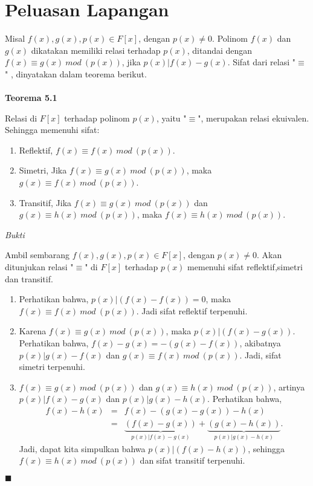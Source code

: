 \chapter{Peluasan Lapangan}
\par 	Misal $f(x),g(x),p(x) \in F[x]$, dengan $p(x) \ne 0$. Polinom $f(x)$ dan $g(x)$ dikatakan memiliki relasi terhadap $p(x)$, ditandai dengan $f(x) \equiv g(x)~mod~(p(x))$, jika $p(x)|f(x) - g(x)$. Sifat dari relasi "$\equiv$" , dinyatakan dalam teorema berikut.
\\
\\
	\textbf{Teorema 5.1}
\par 	Relasi di $F[x]$ terhadap polinom $p(x)$, yaitu "$\equiv$", merupakan relasi ekuivalen. Sehingga memenuhi sifat:
	\begin{enumerate}
	\item Reflektif, $f(x)\equiv f(x)~mod~(p(x))$.
	\item Simetri, Jika $f(x)\equiv g(x)~mod~(p(x))$, maka $g(x)\equiv f(x)~mod~(p(x))$.
	\item Transitif, Jika $f(x)\equiv g(x)~mod~(p(x))$ dan $g(x)\equiv h(x)~mod~(p(x))$, maka $f(x)\equiv h(x)~mod~(p(x))$.
	\end{enumerate}
	\textit{Bukti}
\par 	Ambil sembarang $f(x),g(x),p(x) \in F[x]$, dengan $p(x) \ne 0$. Akan ditunjukan relasi "$\equiv$" di $F[x]$ terhadap $p(x)$ memenuhi sifat reflektif,simetri dan transitif.
	\begin{enumerate}
	\item Perhatikan bahwa, $p(x)|(f(x)-f(x)) = 0$, maka $f(x)\equiv f(x)~mod~(p(x))$. Jadi sifat reflektif terpenuhi.
	\item Karena $f(x)\equiv g(x)~mod~(p(x))$, maka $p(x)| (f(x)-g(x))$. Perhatikan bahwa, $f(x) - g(x) = -(g(x) - f(x))$, akibatnya $p(x)|g(x) - f(x)$ dan $g(x)\equiv f(x)~mod~(p(x))$. Jadi, sifat simetri terpenuhi.
	\item $f(x)\equiv g(x)~mod~(p(x))$ dan $g(x)\equiv h(x)~mod~(p(x))$, artinya $p(x)|f(x) - g(x)$ dan $p(x)|g(x) - h(x)$. Perhatikan bahwa, 
		$$\begin{array}{rcl}
		f(x) - h(x) &=& f(x) -( g(x) - g(x)) - h(x)\\
			      &=&  \underbrace{(f(x) - g(x))}_{p(x)|f(x) - g(x)} + \underbrace{(g(x)-h(x))}_{p(x)|g(x) - h(x)}.
		\end{array}$$
	Jadi, dapat kita simpulkan bahwa $p(x)| (f(x)-h(x))$, sehingga $f(x)\equiv h(x)~mod~(p(x))$ dan sifat transitif terpenuhi.
	\end{enumerate} $\blacksquare$
